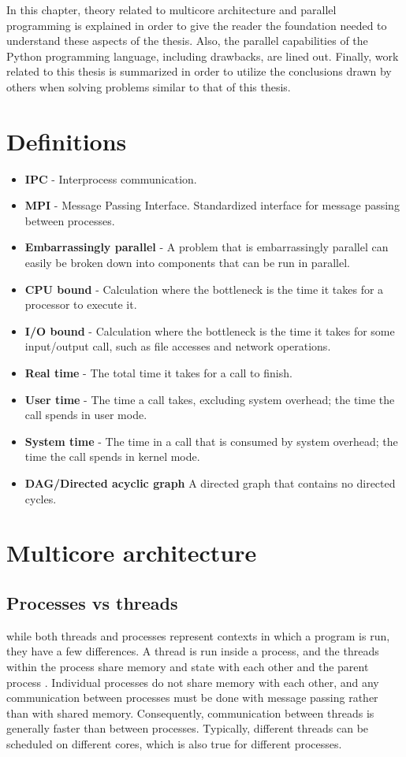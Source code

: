In this chapter, theory related to multicore architecture and parallel programming is
explained in order to give the reader the foundation needed to understand these aspects of
the thesis. Also, the parallel capabilities of the Python programming language, including
drawbacks, are lined out. Finally, work related to this thesis is summarized in order to
utilize the conclusions drawn by others when solving problems similar to that of this thesis.

\section{Definitions}
\begin{itemize}
  \item \textbf{IPC} - Interprocess communication.
  \item \textbf{MPI} - Message Passing Interface. Standardized interface for message passing between processes.
  \item \textbf{Embarrassingly parallel} - A problem that is embarrassingly parallel can easily be broken down into components that
    can be run in parallel. %
  \item \textbf{CPU bound} - Calculation where the bottleneck is the time it takes for a processor to execute it.
  \item \textbf{I/O bound} - Calculation where the bottleneck is the time it takes for some input/output call, such as file accesses
    and network operations.
  \item \textbf{Real time} - The total time it takes for a call to finish.
  \item \textbf{User time} - The time a call takes, excluding system overhead; the time the call spends in user mode.
  \item \textbf{System time} - The time in a call that is consumed by system overhead; the time the call spends in kernel mode.
  \item \textbf{DAG/Directed acyclic graph} A directed graph that contains no directed cycles.
\end{itemize}

\section{Multicore architecture} %
\subsection{Processes vs threads}
while both threads and processes represent contexts in which a program is run, they have a few differences. A thread is run inside
a process, and the threads within the process share memory and state with each other and the parent
process \cite{singh_2013_parallel_padpwprfmm}. Individual processes do not share memory with each other, and any
communication between processes must be done with message passing rather than with shared memory. Consequently, communication
between threads is generally faster than between processes.
Typically, different threads can be scheduled on different cores, which is also true for different processes.

